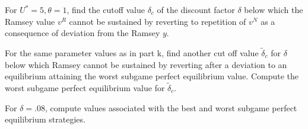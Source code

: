 \medskip
{} For $U^* =5, \theta =1$, find the  cutoff value
$\delta_c$
of the discount factor $\delta$
 below which the Ramsey value $v^R$  cannot
be sustained by reverting to repetition of $v^N$  as a consequence
of deviation from the Ramsey $y$.

\medskip
{}  For the same parameter values as in part k,
find another  cut off value $\tilde \delta_c$ for $\delta$
below which Ramsey cannot be sustained by reverting after a deviation
to an equilibrium attaining the worst subgame   perfect equilibrium
value.  Compute the worst subgame perfect equilibrium value for
$\tilde \delta_c$.

\medskip
{}  For $\delta =.08 $, compute
values associated with
the best and worst subgame perfect equilibrium strategies.

